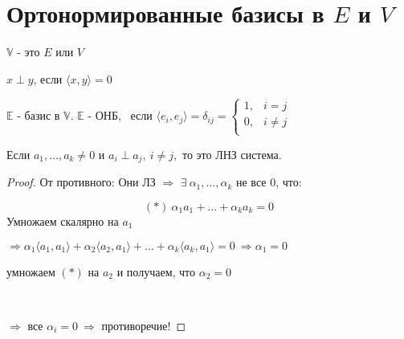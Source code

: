 \section{Ортонормированные базисы в $E$ и $V$}

$\mathbb{V}$ - это $E$ или $V$

\begin{shdef}
    \begin{definition}
        $x \perp y$, если $\langle x, y \rangle = 0$
    \end{definition}
    
    \begin{definition}
        $\mathbb{E}$ - базис в $\mathbb{V}$. \quad
        $\mathbb{E}$ - ОНБ, \ если $\langle e_{i}, e_{j} \rangle = \delta_{ij} = \begin{cases}
        1, & i = j \\
        0, & i \neq j \\
        \end{cases}$
    \end{definition}
\end{shdef}

\vspace{0.4cm}
\begin{shth}
    \begin{theorem}
        Если $a_{1}, \ldots, a_{k} \neq 0$ и $a_{i} \perp a_{j}, \ i \neq j,$ то это ЛНЗ система.
    \end{theorem}
\end{shth}

\begin{proof}
\leavevmode \newline

    От противного: Они ЛЗ $\Longrightarrow$ $\exists \ \alpha_{1}, \ldots, \alpha_{k}$ не все 0, что: 
\newline 

    $$(*) \ \alpha_{1} a_{1} + \ldots + \alpha_{k} a_{k} = 0$$
    Умножаем скалярно на $a_{1}$
    \newline
    
    $\Longrightarrow \alpha_{1} \langle a_{1}, a_{1} \rangle + \alpha_{2} \langle a_{2}, a_{1} \rangle + \ldots + \alpha_{k} \langle a_{k}, a_{1} \rangle = 0 \ \Longrightarrow \alpha_{1} = 0$
    \newline
    
    умножаем $(*)$ на $a_{2}$ и получаем, что $\alpha_{2} = 0$
    
    \
    
    $\Longrightarrow$ все $\alpha_{i} = 0 \ \Longrightarrow$ противоречие! 
\end{proof}
\vspace{0.6cm}

